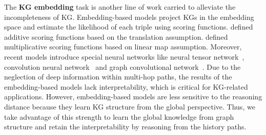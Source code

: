 The \textbf{KG embedding} task is another line of work carried to alleviate the incompleteness of KG.
Embedding-based models project KGs in the embedding space and estimate the likelihood of each triple using scoring functions.
\cite{bordes2013translating,wang2014knowledge,lin2015learning,ji2016knowledge} defined additive scoring functions based on the translation assumption.
\cite{yang2014embedding,trouillon2017complex} defined multiplicative scoring functions based on linear map assumption.
Moreover, recent models introduce special neural networks like neural tensor network~\cite{NIPS2013_tensor}, convolution neural network~\cite{Dettmers2018Convolutional} and graph convolutional network~\cite{nathani-etal-2019-learning}.
Due to the neglection of deep information within multi-hop paths, the results of the embedding-based models lack interpretability, which is critical for KG-related applications. 
However, embedding-based models are less sensitive to the reasoning distance because they learn KG structure from the global perspective.
Thus, we take advantage of this strength to learn the global knowledge from graph structure and retain the interpretability by reasoning from the history paths. 




